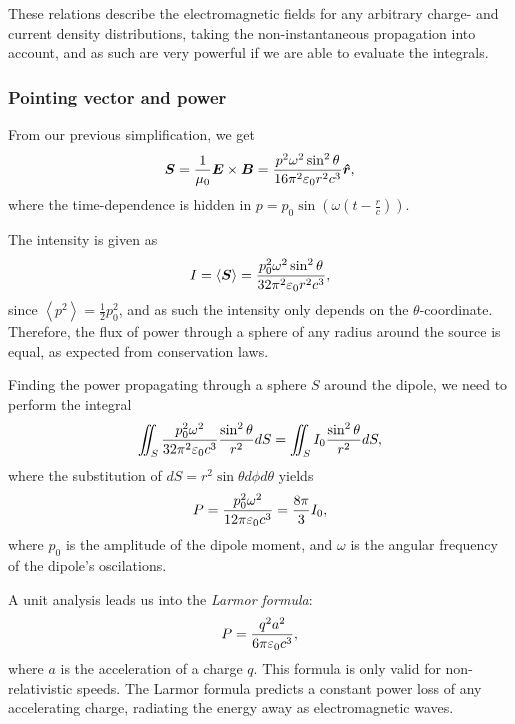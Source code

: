         These relations describe the electromagnetic fields for any arbitrary charge- and current density distributions, 
        taking the non-instantaneous propagation into account,
        and as such are very powerful if we are able to evaluate the integrals.
    
    \subsubsection*{Pointing vector and power}
        From our previous simplification, we get
        \begin{equation}
            \vec{S} = \frac{1}{\mu_0}\E\times\B = \frac{p^2\omega^2\sin^2\theta}{16\pi^2\e r^2 c^3}\hat{r},
        \end{equation}
        where the time-dependence is hidden in $p = p_0\sin\left(\omega\left(t - \frac{r}{c}\right)\right)$.
    
        The intensity is given as 
        \begin{equation}
            I = \left<\bm{S}\right> = \frac{p_0^2\omega^2\sin^2\theta}{32\pi^2\varepsilon_0 r^2 c^3},
        \end{equation}
        since $\left<p^2\right> = \frac{1}{2}p_0^2$, and as such the intensity only depends on the $\theta$-coordinate. 
        Therefore, the flux of power through a sphere of any radius around the source is equal, as expected from conservation laws. 

        Finding the power propagating through a sphere $S$ around the dipole, we need to perform the integral 
        \begin{equation*}
            \iint_S \frac{p_0^2\omega^2}{32\pi^2\varepsilon_0 c^3} \frac{\sin^2\theta}{r^2} dS = \iint_S I_0\frac{\sin^2\theta}{r^2} dS,
        \end{equation*}
        where the substitution of $dS = r^2\sin\theta d\phi d\theta$ yields 
        \begin{equation}
            P = \frac{p_0^2\omega^2}{12\pi\varepsilon_0 c^3} = \frac{8\pi}{3}I_0,
        \end{equation}
        where $p_0$ is the amplitude of the dipole moment, and $\omega$ is the angular frequency of the dipole's oscilations.

        A unit analysis leads us into the \textit{Larmor formula}:
        \begin{equation}
            P = \frac{q^2a^2}{6\pi\varepsilon_0 c^3},
        \end{equation}
        where $a$ is the acceleration of a charge $q$. This formula is only valid for non-relativistic speeds. 
        The Larmor formula predicts a constant power loss of any accelerating charge, radiating the energy away as electromagnetic waves.

